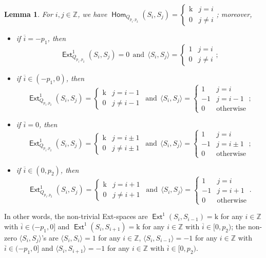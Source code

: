 \documentclass[reqno,12pt,a4paper]{amsart}
\newtheorem{lemma}[theorem]{Lemma}
\theoremstyle{remark}
\theoremstyle{definition}
\newcommand{\opname}[1]{\operatorname{\mathsf{#1}}}
\newcommand{\Hom}{\opname{Hom}}
\newcommand{\Ext}{\opname{Ext}}
\newcommand{\fk}{{\mathrm k}}
\numberwithin{equation}{section}
\begin{document}
\begin{lemma}
\label{lem:Euler-form-zigzag}
For $i,j\in\mathbb{Z}$, we have $\Hom_{Q_{p_1,p_2}}(S_i,S_j)=\begin{cases} \fk & j=i\\ 0 &j\neq i\end{cases}$; moreover,
\begin{itemize}
\item[(1)] if $\overline{i}=-p_1$, then
\[
\Ext^1_{Q_{p_1,p_2}}(S_i,S_j)=0~~\text{and}~~\langle S_i,S_j\rangle=\begin{cases} 1 & j=i\\ 0 &j\neq i\end{cases};
\]
\item[(2)] if $\overline{i}\in (-p_1,0)$, then
\[
\Ext^1_{Q_{p_1,p_2}}(S_i,S_j)=\begin{cases} \fk & j=i-1\\ 0 & j\neq i-1\end{cases}~~\text{and}~~\langle S_i,S_j\rangle=\begin{cases} 1 & j=i\\ -1 & j=i-1\\ 0 &\text{otherwise}\end{cases};
\]
\item[(3)] if $\overline{i}=0$, then
\[
\Ext^1_{Q_{p_1,p_2}}(S_i,S_j)=\begin{cases} \fk & j=i\pm1\\ 0 & j\neq i\pm1\end{cases}~~\text{and}~~\langle S_i,S_j\rangle=\begin{cases} 1 & j=i\\ -1 & j=i\pm1\\ 0 &\text{otherwise}\end{cases};
\]
\item[(4)] if $\overline{i}\in (0,p_2)$, then
\[
\Ext^1_{Q_{p_1,p_2}}(S_i,S_j)=\begin{cases} \fk & j=i+1\\ 0 & j\neq i+1\end{cases}~~\text{and}~~\langle S_i,S_j\rangle=\begin{cases} 1 & j=i\\ -1 & j=i+1\\ 0 &\text{otherwise}\end{cases}.
\]
\end{itemize}
\end{lemma}

In other words, the non-trivial Ext-spaces are $\Ext^1(S_i,S_{i-1})=\fk$ for any $i\in\mathbb{Z}$ with $\overline{i}\in (-p_1,0]$ and $\Ext^1(S_i,S_{i+1})=\fk$ for any $i\in\mathbb{Z}$ with $\overline{i}\in [0,p_2)$; the non-zero $\langle S_i,S_j\rangle$'s  are $\langle S_i,S_{i}\rangle=1$ for any $i\in\mathbb{Z}$, $\langle S_i,S_{i-1}\rangle=-1$ for any $i\in\mathbb{Z}$ with $\overline{i}\in (-p_1,0]$ and $\langle S_i,S_{i+1}\rangle=-1$ for any $i\in\mathbb{Z}$ with $\overline{i}\in [0,p_2)$.
\end{document}
